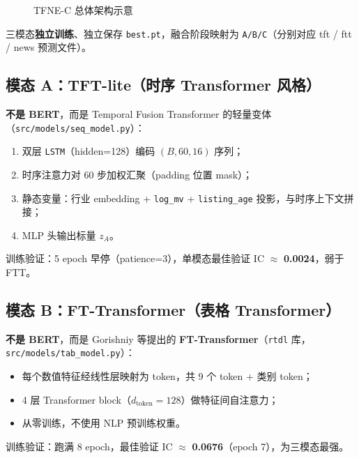 \documentclass[UTF8,a4paper,12pt]{ctexart}
\begin{document}
\begin{figure}[H]
\centering
{}
\caption{TFNE-C 总体架构示意}
\label{fig:arch-c}
\end{figure}

三模态\textbf{独立训练}、独立保存 \texttt{best.pt}，融合阶段映射为 \texttt{A/B/C}（分别对应 tft / ftt / news 预测文件）。

\subsection{模态 A：TFT-lite（时序 Transformer 风格）}

\textbf{不是 BERT}，而是 Temporal Fusion Transformer 的轻量变体（\texttt{src/models/seq\_model.py}）：
\begin{enumerate}[leftmargin=2em]
  \item 双层 \texttt{LSTM}（hidden=128）编码 $(B,60,16)$ 序列；
  \item 时序注意力对 60 步加权汇聚（padding 位置 mask）；
  \item 静态变量：行业 embedding + \texttt{log\_mv} + \texttt{listing\_age} 投影，与时序上下文拼接；
  \item MLP 头输出标量 $z_A$。
\end{enumerate}
训练验证：5 epoch 早停（patience=3），单模态最佳验证 IC $\approx$ \textbf{0.0024}，弱于 FTT。

\subsection{模态 B：FT-Transformer（表格 Transformer）}

\textbf{不是 BERT}，而是 Gorishniy 等提出的 \textbf{FT-Transformer}（\texttt{rtdl} 库，\texttt{src/models/tab\_model.py}）：
\begin{itemize}[leftmargin=2em]
  \item 每个数值特征经线性层映射为 token，共 9 个 token + 类别 token；
  \item 4 层 Transformer block（$d_{\mathrm{token}}=128$）做特征间自注意力；
  \item 从零训练，不使用 NLP 预训练权重。
\end{itemize}
训练验证：跑满 8 epoch，最佳验证 IC $\approx$ \textbf{0.0676}（epoch 7），为三模态最强。
\end{document}
